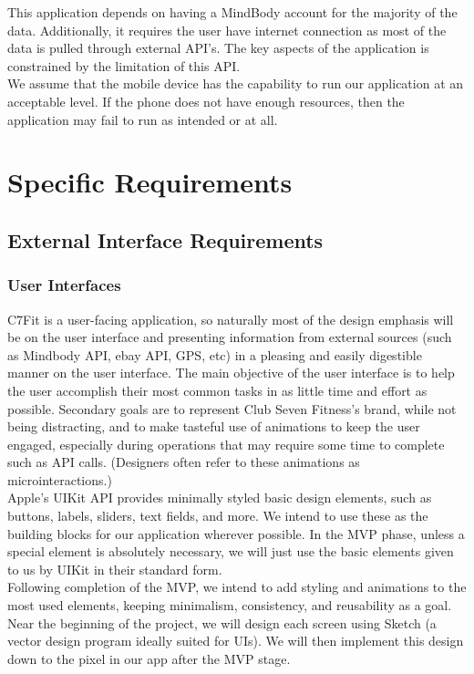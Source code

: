 \documentclass[letterpaper,10pt,titlepage]{article}
\begin{document}
This application depends on having a MindBody account for the majority of the data. Additionally, it requires the user have internet connection as most of the data is pulled through external API's. The key aspects of the application is constrained by the limitation of this API.\\

We assume that the mobile device has the capability to run our application at an acceptable level. If the phone does not have enough resources, then the application may fail to run as intended or at all.

\section{Specific Requirements}

\subsection{External Interface Requirements}

\subsubsection{User Interfaces}

C7Fit is a user-facing application, so naturally most of the design emphasis will be on the user interface and presenting information from external sources (such as Mindbody API, ebay API, GPS, etc) in a pleasing and easily digestible manner on the user interface. The main objective of the user interface is to help the user accomplish their most common tasks in as little time and effort as possible. Secondary goals are to represent Club Seven Fitness's brand, while not being distracting, and to make tasteful use of animations to keep the user engaged, especially during operations that may require some time to complete such as API calls. (Designers often refer to these animations  as microinteractions.)\\

Apple's UIKit API provides minimally styled basic design elements, such as buttons, labels, sliders, text fields, and more. We intend to use these as the building blocks for our application wherever possible. In the MVP phase, unless a special element is absolutely necessary, we will just use the basic elements given to us by UIKit in their standard form.\\

Following completion of the MVP, we intend to add styling and animations to the most used elements, keeping minimalism, consistency, and reusability as a goal. Near the beginning of the project, we will design each screen using Sketch (a vector design program ideally suited for UIs). We will then implement this design down to the pixel in our app after the MVP stage.\\
\end{document}
